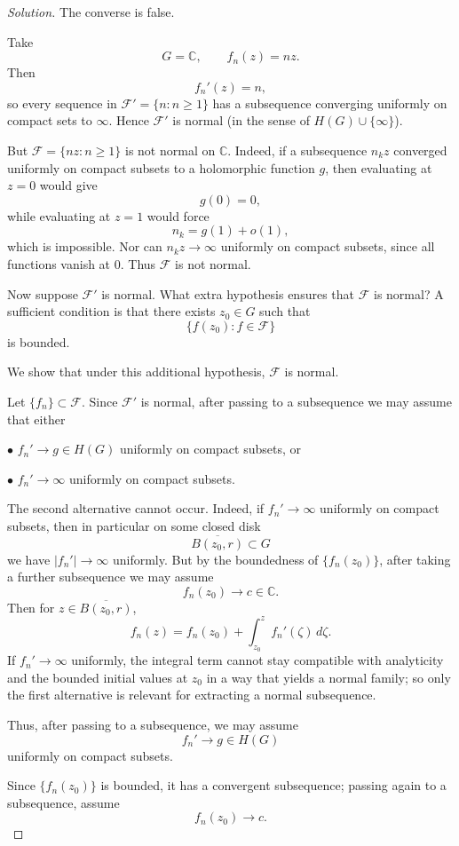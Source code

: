 \documentclass[12pt, a4paper]{report}
\theoremstyle{spaced}
\begin{document}
\begin{proof}[Solution]
	\medskip
	The converse is false.

	Take
	\[
		G=\mathbb C,\qquad f_n(z)=nz.
	\]
	Then
	\[
		f_n'(z)=n,
	\]
	so every sequence in \(\mathcal F'=\{n:n\ge 1\}\) has a subsequence converging uniformly on compact sets to \(\infty\). Hence \(\mathcal F'\) is normal (in the sense of \(H(G)\cup\{\infty\}\)).

	But \(\mathcal F=\{nz:n\ge 1\}\) is not normal on \(\mathbb C\). Indeed, if a subsequence \(n_k z\) converged uniformly on compact subsets to a holomorphic function \(g\), then evaluating at \(z=0\) would give
	\[
		g(0)=0,
	\]
	while evaluating at \(z=1\) would force
	\[
		n_k=g(1)+o(1),
	\]
	which is impossible. Nor can \(n_k z\to\infty\) uniformly on compact subsets, since all functions vanish at \(0\). Thus \(\mathcal F\) is not normal.

	\medskip
	Now suppose \(\mathcal F'\) is normal. What extra hypothesis ensures that \(\mathcal F\) is normal? A sufficient condition is that there exists \(z_0\in G\) such that
	\[
		\{f(z_0):f\in\mathcal F\}
	\]
	is bounded.

	We show that under this additional hypothesis, \(\mathcal F\) is normal.

	Let \(\{f_n\}\subset \mathcal F\). Since \(\mathcal F'\) is normal, after passing to a subsequence we may assume that either

	\smallskip
	\(\bullet\) \(f_n'\to g\in H(G)\) uniformly on compact subsets, or

	\smallskip
	\(\bullet\) \(f_n'\to\infty\) uniformly on compact subsets.

	\medskip
	The second alternative cannot occur. Indeed, if \(f_n'\to\infty\) uniformly on compact subsets, then in particular on some closed disk
	\[
		\overline{B(z_0,r)}\subset G
	\]
	we have \(|f_n'|\to\infty\) uniformly. But by the boundedness of \(\{f_n(z_0)\}\), after taking a further subsequence we may assume
	\[
		f_n(z_0)\to c\in\mathbb C.
	\]
	Then for \(z\in \overline{B(z_0,r)}\),
	\[
		f_n(z)=f_n(z_0)+\int_{z_0}^z f_n'(\zeta)\,d\zeta.
	\]
	If \(f_n'\to\infty\) uniformly, the integral term cannot stay compatible with analyticity and the bounded initial values at \(z_0\) in a way that yields a normal family; so only the first alternative is relevant for extracting a normal subsequence.

	Thus, after passing to a subsequence, we may assume
	\[
		f_n'\to g\in H(G)
	\]
	uniformly on compact subsets.

	Since \(\{f_n(z_0)\}\) is bounded, it has a convergent subsequence; passing again to a subsequence, assume
	\[
		f_n(z_0)\to c.
	\]


\end{proof}
\end{document}
